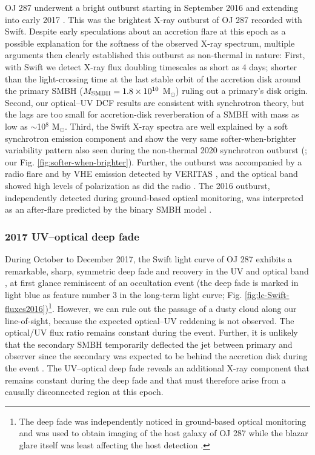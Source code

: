 \documentclass[preprints,article,accept,moreauthors,pdftex]{Definitions/mdpi}
\begin{document}
{OJ 287 underwent a bright outburst starting in September 2016 and extending into early 2017 \citep{Komossa2017, Komossa2020}. This was the brightest X-ray outburst of OJ 287 recorded with Swift. 
Despite early speculations about an accretion 
flare at this epoch as a possible explanation for the softness of the observed X-ray spectrum, multiple arguments then clearly established this outburst as
non-thermal in nature: 
First, with Swift we detect X-ray
flux doubling timescales as short as 4 days; shorter than the light-crossing time at the last stable orbit of the accretion disk around the primary SMBH ($M_{\rm SMBH} = 1.8 \times 10^{10}$ M$_{\odot}$)
ruling out a primary's disk origin. 
Second, our optical--UV DCF results are consistent with synchrotron theory, but the lags are too small for accretion-disk reverberation of a SMBH with mass as low as $\sim$10$^{8}$ M$_{\odot}$. 
Third, the Swift X-ray spectra are well explained by a soft synchrotron emission component and show the very same softer-when-brighter variability pattern also seen during the non-thermal 2020 synchrotron outburst (\citep{Komossa2020}; our Fig. \ref{fig:softer-when-brighter}).
Further, the outburst was accompanied by a radio
flare \citep{Myserlis2018, Lee2020} and by VHE emission detected by VERITAS 
\citep{OBrien2017}, and the optical band showed high levels of polarization \citep{Valtonen2017} as did the radio \citep{Goddi2021}. The 2016 outburst, independently detected during ground-based optical monitoring, was interpreted as an after-flare predicted by the binary SMBH model \citep{Valtonen2017}. 

\subsubsection{2017 UV--optical deep fade}


During October to December 2017, the Swift light curve of OJ 287 exhibits a remarkable, sharp, symmetric deep fade and recovery in the UV and optical band \citep{Komossa2020, Komossa2021c}, at first glance reminiscent of an occultation event (the deep fade is marked in light blue as feature number 3 in the long-term light curve; Fig. \ref{fig:lc-Swift-fluxes2016}){\footnote{The deep fade was independently noticed in ground-based optical monitoring and was used to obtain imaging of the host galaxy of OJ 287 while the blazar glare itself was least affecting the host detection \citep{Nilsson2020}.}}. However, we can rule out the passage of a dusty cloud along our line-of-sight, because the expected optical--UV reddening is not observed. The optical/UV flux ratio remains constant during the event. Further, it is unlikely that the secondary SMBH temporarily deflected the jet between primary and observer \citep{Takalo1990} since the secondary was expected to be behind the accretion disk during the event \citep{Dey2018, Dey2021}. 
The UV--optical deep fade reveals an additional X-ray component that remains constant during the deep fade and that must therefore arise from a causally disconnected region at this epoch.   

}
\end{document}
